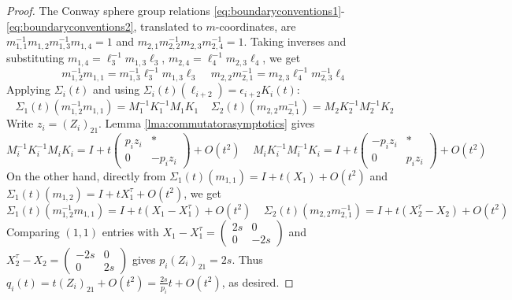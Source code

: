 \documentclass{article}
\theoremstyle{plain}
\theoremstyle{definition}
\theoremstyle{plain}
\theoremstyle{plain}
\theoremstyle{plain}
\theoremstyle{remark}
\theoremstyle{remark}
\theoremstyle{plain}
\theoremstyle{plain}
\theoremstyle{plain}
\theoremstyle{plain}
\begin{document}
\begin{proof}
The Conway sphere group relations \eqref{eq:boundaryconventions1}-\eqref{eq:boundaryconventions2}, translated to $m$-coordinates, are $m_{1, 1}^{-1}m_{1, 2}m_{1, 3}^{-1}m_{1, 4} = 1$ and $m_{2,1}m_{2,2}^{-1}m_{2,3}m_{2,4}^{-1} = 1$. Taking inverses and substituting $m_{1, 4} = \ell_3^{-1}m_{1,3}\ell_3$, $m_{2,4} = \ell_4^{-1}m_{2,3}\ell_4$, we get
\begin{equation*}
	m_{1,2}^{-1}m_{1,1} = m_{1,3}^{-1}\ell_3^{-1}m_{1,3}\ell_3 \ \ \ \ \ m_{2,2}m_{2,1}^{-1} = m_{2,3}\ell_4^{-1}m_{2,3}^{-1}\ell_4
\end{equation*}
Applying $\Sigma_i(t)$ and using $\Sigma_i(t)(\ell_{i+2}) = \epsilon_{i+2}K_i(t)$:
\begin{equation*}
	\Sigma_1(t)(m_{1,2}^{-1}m_{1,1}) = M_1^{-1}K_1^{-1}M_1K_1 \ \ \ \ \ \Sigma_2(t)(m_{2,2}m_{2,1}^{-1}) = M_2K_2^{-1}M_2^{-1}K_2
\end{equation*}
Write $z_i = (Z_i)_{21}$. Lemma \ref{lma:commutatorasymptotics} gives
\begin{equation*}
	M_i^{-1}K_i^{-1}M_iK_i = I + t\begin{pmatrix}p_iz_i & * \\ 0 & -p_iz_i\end{pmatrix} + O(t^2) \ \ \ \ \ M_iK_i^{-1}M_i^{-1}K_i = I + t\begin{pmatrix}-p_iz_i&*\\0&p_iz_i\end{pmatrix} + O(t^2)
\end{equation*} 
On the other hand, directly from $\Sigma_1(t)(m_{1,1}) = I + t(X_1) + O(t^2)$ and $\Sigma_1(t)(m_{1,2}) = I + tX_1^\tau + O(t^2)$, we get
\begin{equation*}
	\Sigma_1(t)(m_{1,2}^{-1}m_{1,1}) = I + t(X_1 - X_1^\tau) + O(t^2) \ \ \ \ \ \Sigma_2(t)(m_{2,2}m_{2,1}^{-1}) = I + t(X_2^\tau - X_2) + O(t^2)
\end{equation*}
Comparing $(1,1)$ entries with $X_1 - X_1^\tau = \left(\begin{smallmatrix}2s&0\\0&-2s\end{smallmatrix}\right)$ and $X_2^\tau-X_2=\left(\begin{smallmatrix}-2s&0\\0&2s\end{smallmatrix}\right)$ gives $p_i(Z_i)_{21} = 2s$. Thus $q_i(t) = t(Z_i)_{21} + O(t^2) = \frac{2s}{p_i}t+ O(t^2)$, as desired. 

\medskip


\end{proof}
\end{document}
